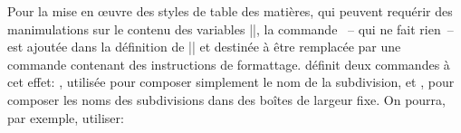 \begin{developer}
Pour la mise en œuvre des styles de table des matières, qui peuvent requérir des manimulations sur le contenu des variables |\cftXname|, la commande ~-- qui ne fait rien~-- est ajoutée dans la définition de |\cftXname| et destinée à être remplacée par une commande contenant des instructions de formattage. \frenchlaw définit deux commandes à cet effet: , utilisée pour composer simplement le nom de la subdivision, et , pour composer les noms des subdivisions dans des boîtes de largeur fixe. On pourra, par exemple, utiliser:
\par\vspace{-\baselineskip}
\begin{macro}
\def\cftchaptername{\maketoclabel{Chapitre}}
\let\maketoclabel=\toclabelbox
\end{macro} 
\end{developer}

\begin{noprint}
\newcommand{\maketoclabel}[1]{#1}

\newcommand{\toclabelbox}[1]{\makebox[\toclabelwidth]{\hfill\llap{#1\normalsize\space}}}
\newcommand{\toclabelnobox}[1]{#1\normalsize\space}
\end{noprint}

